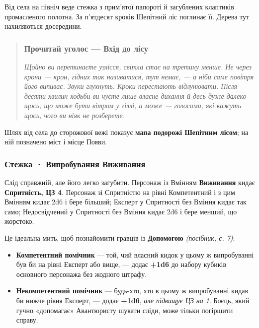 \documentclass[10pt,a4paper]{article}
\newcommand{\tightlist}{\setlength{\itemsep}{0pt}\setlength{\parskip}{0pt}}
\begin{document}
Від села на північ веде стежка з прим’ятої папороті й загублених клаптиків промасленого полотна. За п’ятдесят кроків Шепітний ліс поглинає її. Дерева тут нахиляються досередини.

\begin{quote}
\subsubsection{Прочитай уголос --- Вхід до лісу}\label{ux43fux440ux43eux447ux438ux442ux430ux439-ux443ux433ux43eux43bux43eux441-ux443-ux43bux456ux441ux456}

\emph{Щойно ви перетинаєте узлісся, світла стає на третину менше. Не через крони --- крон, гідних так називатися, тут немає, --- а ніби саме повітря його випиває. Звуки глухнуть. Кроки перестають відлунювати. Після десяти хвилин ходьби ви чуєте лише власне дихання й десь дуже далеко щось, що може бути вітром у гіллі, а може --- голосами, які кажуть щось, чого ви ніяк не розберете.}
\end{quote}

Шлях від села до сторожової вежі показує \textbf{мапа подорожі Шепітним лісом}; на ній позначено міст і місце Появи.

\subsubsection{Стежка · Випробування Виживання}\label{ux441ux442ux435ux436ux43aux430-ux432ux438ux43fux440ux43eux431ux443ux432ux430ux43dux43dux44f-ux432ux438ux436ux438ux432ux430ux43dux43dux44f}

Слід справжній, але його легко загубити. Персонаж із Вмінням \textbf{Виживання} кидає \textbf{Спритність, ЦЗ 4}. Персонаж зі Спритністю на рівні Компетентний і з цим Вмінням кидає 2d6 і бере більший; Експерт у Спритності без Вміння кидає так само; Недосвідчений у Спритності без Вміння кидає 2d6 і бере менший, що жорстоко.

Це ідеальна мить, щоб познайомити гравців із \textbf{Допомогою} \emph{(посібник, с. 7)}:

\begin{itemize}
\tightlist
\item
  \textbf{Компетентний помічник} --- той, чий власний кидок у цьому ж випробуванні був би на рівні Експерт або вище, --- додає \textbf{+1d6} до набору кубиків основного персонажа без жодного штрафу.
\item
  \textbf{Некомпетентний помічник} --- будь-хто, хто в цьому ж випробуванні кидав би нижче рівня Експерт, --- додає \textbf{+1d6}, \emph{але підвищує ЦЗ на 1}. Боєць, який гучно «допомагає» Авантюристу шукати сліди, може тільки погіршити справу.
\end{itemize}
\end{document}
